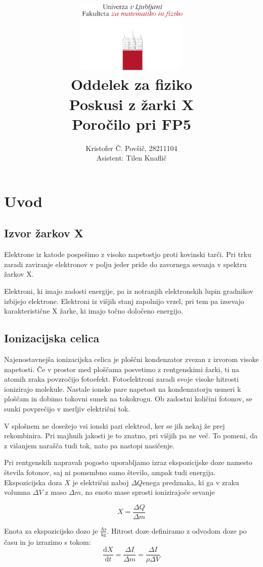 \documentclass[11pt]{article}
\title{
  \includegraphics[width=0.4\textwidth]{fmf_logo}\\
  {\small Oddelek za fiziko} \\
  {Poskusi z žarki X}\\
  {\small Poročilo pri FP5}\\
}
\date{}
\author{ Kristofer Č. Povšič, 28211104 \\[5 cm]
 \small  Asistent: Tilen Knaflič \\
}
\begin{document}
\maketitle
\newpage
\tableofcontents
\newpage
\section{Uvod}\label{sec:org9821085}
\subsection{Izvor žarkov X}\label{sec:org77d27ca}
Elektrone iz katode pospešimo z visoko napetostjo proti kovinski tarči. Pri trku zaradi zaviranje elektronov v polju jeder pride do zavornega sevanja v spektru žarkov X.

Elektroni, ki imajo zadosti energije, pa iz notranjih elektronskih lupin gradnikov izbijejo elektrone. Elektroni iz višjih stanj zapolnijo vrzel, pri tem pa izsevajo karakteristične X žarke, ki imajo točno določeno energijo.
\subsection{Ionizacijska celica}\label{sec:org639605f}
Najenostavnejša ionizacijska celica je ploščni kondenzator zvezan z izvorom visoke napetosti. Če v prostor med ploščama posvetimo z rentgenskimi žarki, ti na atomih zraka povzročijo fotoefekt. Fotoelektroni zaradi svoje visoke hitrosti ionizirajo molekule. Nastale ionske pare napetost na kondenzatorju usmeri k ploščam in dobimo tokovni sunek na tokokrogu. Ob zadostni količini fotonov, se sunki povprečijo v merljiv električni tok.

V splošnem ne dosežejo vsi ionski pari elektrod, ker se jih nekaj že prej rekombinira. Pri majhnih jakosti je to znatno, pri višjih pa ne več. To pomeni, da z višanjem narašča tudi tok, nato pa nastopi nasičenje.

Pri rentgenskih napravah pogosto uporabljamo izraz ekspozicijske doze namesto števila fotonov, saj ni pomembno samo število, ampak tudi energija. Ekspozicijska doza \(X\) je električni naboj \(\Delta Q\)enega predznaka, ki ga v zraku volumna \(\Delta V\) z maso \(\Delta m\), na enoto mase sprosti ionizirajoče sevanje

\[ X = \frac{\Delta Q}{\Delta m} 
\]

Enota za ekspozicijsko dozo je \(\frac{\mathrm{As}}{\mathrm{kg}}\). Hitrost doze definiramo z odvodom doze po času in jo izrazimo s tokom:
\begin{equation}\label{eq:1}
\frac{\mathrm{d} X}{\mathrm{d} t} = \frac{\Delta I}{\Delta m} = \frac{\Delta I }{\rho \Delta V}
\end{equation}
\end{document}
